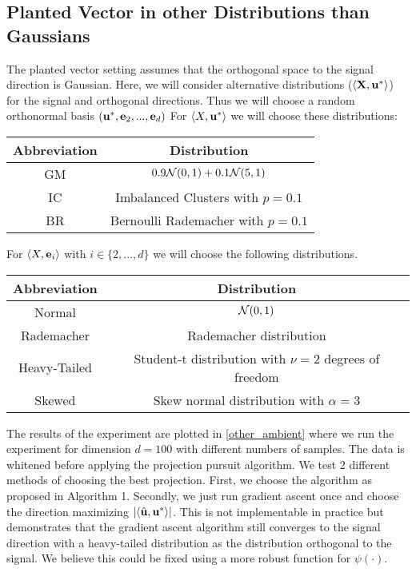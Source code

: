 \subsection{Planted Vector in other Distributions than Gaussians}
The planted vector setting assumes that the orthogonal space to the signal direction is Gaussian.
Here, we will consider alternative distributions ($\left\langle \mathbf{X}, \mathbf{u}^* \right\rangle$) for the signal and orthogonal directions.
Thus we will choose a random orthonormal basis $(\mathbf{u}^*, \mathbf{e}_2, ..., \mathbf{e}_d)$
For $\left\langle X, \mathbf{u}^* \right\rangle$ we will choose these distributions:
\begin{center}
\begin{tabular}{ c|c } 
\textbf{Abbreviation} & \textbf{Distribution} \\ 
\hline
GM & $0.9 \mathcal{N}(0, 1) + 0.1 \mathcal{N}(5, 1)$ \\ 
\hline
IC & Imbalanced Clusters with $p = 0.1$ \\ 
\hline
BR & Bernoulli Rademacher with $p = 0.1$ \\ 
\end{tabular}
\end{center}

For $\left\langle X, \mathbf{e}_i \right\rangle$ with $i \in \{ 2, ..., d\}$ we will choose the following distributions.

\begin{center}
\begin{tabular}{ c|c } 
\textbf{Abbreviation} & \textbf{Distribution} \\ 
\hline
Normal & $\mathcal{N}(0, 1)$ \\ 
\hline
Rademacher & Rademacher distribution\\ 
\hline
Heavy-Tailed & Student-t distribution with $\nu = 2$ degrees of freedom\\ 
\hline
Skewed & Skew normal distribution with $\alpha = 3$
\end{tabular}
\end{center}

The results of the experiment are plotted in \autoref{other_ambient} where we run the experiment for dimension $d = 100$ with different numbers of samples.
The data is whitened before applying the projection pursuit algorithm.
We test 2 different methods of choosing the best projection. 
First, we choose the algorithm as proposed in Algorithm 1.
Secondly, we just run gradient ascent once and choose the direction maximizing $\left|\left\langle \hat{\mathbf{u}}, \mathbf{u}^* \right\rangle\right|$.
This is not implementable in practice but demonstrates that the gradient ascent algorithm still converges to the signal direction with a heavy-tailed distribution as the distribution orthogonal to the signal.
We believe this could be fixed using a more robust function for $\psi(\cdot)$.

